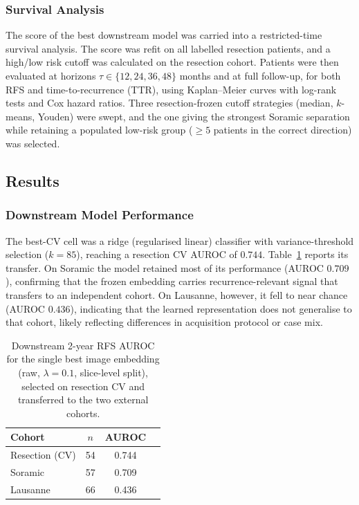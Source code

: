 \documentclass[12pt,twoside]{report}
\begin{document}
\subsubsection*{Survival Analysis}

The score of the best downstream model was carried into a restricted-time survival analysis.
The score was refit on all labelled resection patients, and a high/low risk cutoff was calculated 
on the resection cohort. Patients were then evaluated at horizons
$\tau \in \{12, 24, 36, 48\}$ months and at full follow-up, for both RFS and time-to-recurrence
(TTR), using Kaplan--Meier curves with log-rank tests and Cox hazard ratios.
Three resection-frozen cutoff strategies (median, $k$-means, Youden) were swept, and the one
giving the strongest Soramic separation while retaining a populated low-risk group
($\geq 5$ patients in the correct direction) was selected.

\subsection*{Results}

\subsubsection*{Downstream Model Performance}

The best-CV cell was a ridge (regularised linear) classifier with variance-threshold selection
($k=85$), reaching a resection CV AUROC of $0.744$. Table~\ref{tab:external_downstream} reports
its transfer. On Soramic the model retained most of its performance (AUROC $0.709$), confirming
that the frozen embedding carries recurrence-relevant signal that transfers to an independent
cohort. On Lausanne, however, it fell to near chance (AUROC $0.436$), indicating that the learned
representation does not generalise to that cohort, likely reflecting differences in acquisition
protocol or case mix.

\begin{table}[H]
\centering
\small
\caption{Downstream 2-year RFS AUROC for the single best image embedding
(raw, $\lambda=0.1$, slice-level split), selected on resection CV and transferred
to the two external cohorts.}
\label{tab:external_downstream}
\begin{tabular}{lccc}
\hline
Cohort & $n$ & AUROC \\
\hline
Resection (CV) & 54 & 0.744 \\
Soramic        & 57 & 0.709 \\
Lausanne       & 66 & 0.436 \\
\hline
\end{tabular}
\end{table}
\end{document}
